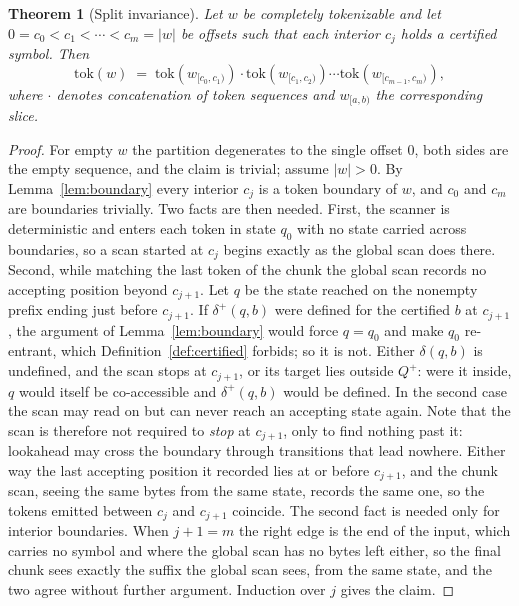 \documentclass[11pt,a4paper]{article}
\theoremstyle{definition}
\theoremstyle{plain}
\newtheorem{theorem}{Theorem}
\begin{document}
\begin{theorem}[Split invariance]
\label{thm:main}
Let $w$ be completely tokenizable and let $0 = c_0 < c_1 < \cdots < c_m = |w|$ be offsets such that each interior
$c_j$ holds a certified symbol. Then
\[
\mathrm{tok}(w) \;=\; \mathrm{tok}(w_{[c_0,c_1)}) \cdot \mathrm{tok}(w_{[c_1,c_2)}) \cdots
\mathrm{tok}(w_{[c_{m-1},c_m)}),
\]
where $\cdot$ denotes concatenation of token sequences and $w_{[a,b)}$ the corresponding slice.
\end{theorem}

\begin{proof} For empty $w$ the partition degenerates to the single offset $0$, both sides are the empty sequence, and
the claim is trivial; assume $|w| > 0$. By Lemma~\ref{lem:boundary} every interior $c_j$ is a token boundary of $w$,
and $c_0$ and $c_m$ are boundaries trivially. Two facts are then needed. First, the scanner is deterministic and
enters each token in state $q_0$ with no state carried across boundaries, so a scan started at $c_j$ begins exactly as
the global scan does there. Second, while matching the last token of the chunk the global scan records no accepting
position beyond $c_{j+1}$. Let $q$ be the state reached on the nonempty prefix ending just before $c_{j+1}$. If
$\delta^+(q, b)$ were defined for the certified $b$ at $c_{j+1}$, the argument of Lemma~\ref{lem:boundary} would force
$q = q_0$ and make $q_0$ re-entrant, which Definition~\ref{def:certified} forbids; so it is not. Either $\delta(q, b)$
is undefined, and the scan stops at $c_{j+1}$, or its target lies outside $Q^+$: were it inside, $q$ would itself be
co-accessible and $\delta^+(q, b)$ would be defined. In the second case the scan may read on but can never reach an
accepting state again. Note that the scan is therefore not required to \emph{stop} at $c_{j+1}$, only to find nothing
past it: lookahead may cross the boundary through transitions that lead nowhere. Either way the last accepting
position it recorded lies at or before $c_{j+1}$, and the chunk scan, seeing the same bytes from the same state,
records the same one, so the tokens emitted between $c_j$ and $c_{j+1}$ coincide. The second fact is needed only for
interior boundaries. When $j + 1 = m$ the right edge is the end of the input, which carries no symbol and where the
global scan has no bytes left either, so the final chunk sees exactly the suffix the global scan sees, from the same
state, and the two agree without further argument. Induction over $j$ gives the claim.
\end{proof}
\end{document}
